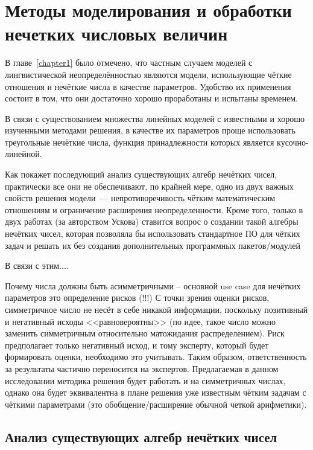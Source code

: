 \chapter{Методы моделирования и обработки нечетких числовых величин}
\label{chapter2}

В главе~\ref{chapter1} было отмечено, что частным случаем моделей с лингвистической неопределённостью являются модели, использующие чёткие отношения и нечёткие числа в качестве параметров. Удобство их применения состоит в том, что они достаточно хорошо проработаны и испытаны временем.

В связи с существованием множества линейных моделей с известными и хорошо изученными методами решения, в качестве их параметров проще использовать треугольные нечёткие числа, функция принадлежности которых является кусочно-линейной.


Как покажет последующий анализ существующих алгебр нечётких чисел, практически все они не обеспечивают, по крайней мере, одно из двух важных свойств решения модели~--- непротиворечивость чётким математическим отношениям и ограничение расширения неопределенности. Кроме того, только в двух работах (за авторством Ускова) ставится вопрос о создании такой алгебры нечётких чисел, которая позволяла бы использовать стандартное ПО для чётких задач и решать их без создания дополнительных программных пакетов/модулей

В связи с этим.... 

Почему числа должны быть асимметричными – основной use case для нечётких параметров это определение рисков (!!!) С точки зрения оценки рисков, симметричное число не несёт в себе никакой информации, поскольку позитивный и негативный исходы <<равновероятны>> (по идее, такое число можно заменить симметричным относительно матожидания распределением). Риск предполагает только негативный исход, и тому эксперту, который будет формировать оценки, необходимо это учитывать. Таким образом, ответственность за результаты частично переносится на экспертов. Предлагаемая в данном исследовании методика решения будет работать и на симметричных числах, однако она будет эквивалентна в плане решения уже известным чётким задачам с чёткими параметрами (это обобщение/расширение обычной четкой арифметики).

\section{Анализ существующих алгебр нечётких чисел}
\label{chapter2_1}


